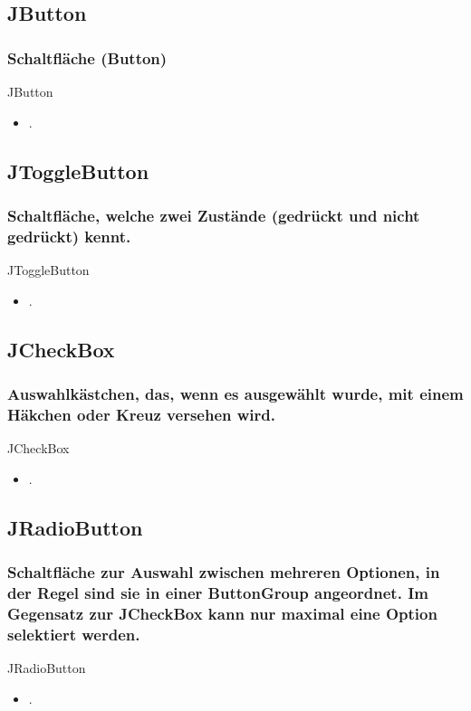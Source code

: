 \documentclass[xcolor=dvipsnames]{beamer}
\begin{document}
\subsection{JButton}
\begin{frame} %
  \frametitle{Schaltfläche (Button)} %
  \begin{block}{JButton}
	  \begin{itemize}
		\item .
	  \end{itemize}
  \end{block}
\end{frame}

\subsection{JToggleButton}
\begin{frame} %
  \frametitle{Schaltfläche, welche zwei Zustände (gedrückt und nicht gedrückt) kennt.} %
  \begin{block}{JToggleButton}
	  \begin{itemize}
		\item .
	  \end{itemize}
  \end{block}
\end{frame}

\subsection{JCheckBox}
\begin{frame} %
  \frametitle{Auswahlkästchen, das, wenn es ausgewählt wurde, mit einem Häkchen oder Kreuz versehen wird.} %
  \begin{block}{JCheckBox}
	  \begin{itemize}
		\item .
	  \end{itemize}
  \end{block}
\end{frame}

\subsection{JRadioButton}
\begin{frame} %
  \frametitle{Schaltfläche zur Auswahl zwischen mehreren Optionen, in der Regel sind sie in einer ButtonGroup angeordnet. Im Gegensatz zur JCheckBox kann nur maximal eine Option selektiert werden.} %
  \begin{block}{JRadioButton}
	  \begin{itemize}
		\item .
	  \end{itemize}
  \end{block}
\end{frame}
\end{document}
